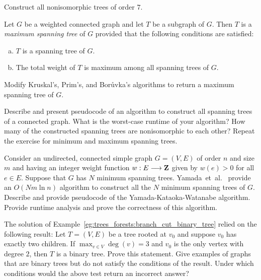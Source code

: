 \begin{problem}
\item Construct all nonisomorphic trees of order $7$.

\item Let $G$ be a weighted connected graph and let $T$ be a subgraph
  of $G$. Then $T$ is a
  \emph{maximum spanning tree} of $G$
  provided that the following conditions are satisfied:
  \begin{enumerate}[(a)]
  \item $T$ is a spanning tree of $G$.

  \item The total weight of $T$ is maximum among all spanning trees of
    $G$.
  \end{enumerate}
  Modify Kruskal's,
  Prim's, and
  Bor\r{u}vka's algorithms to return a
  maximum spanning tree of $G$.

\item Describe and present pseudocode of an algorithm to construct all
  spanning trees of a connected graph. What is the worst-case runtime
  of your algorithm? How many of the constructed spanning trees are
  nonisomorphic to each other? Repeat the exercise for minimum and
  maximum spanning trees.

\item Consider an undirected, connected simple graph $G = (V,E)$ of
  order $n$ and size $m$ and having an integer weight function
  $w: E \longrightarrow \mathbf{Z}$ given by $w(e) > 0$ for all $e \in E$. Suppose that
  $G$ has $N$ minimum spanning trees.
  Yamada~et~al.~\cite{YamadaEtAl2010} provide an
  $O(Nm \ln n)$ algorithm to construct all the $N$ minimum spanning
  trees of $G$. Describe and provide pseudocode of the
  Yamada-Kataoka-Watanabe algorithm. Provide
  runtime analysis and prove the correctness of this algorithm.

\item\label{prob:trees_forests:binary_tree_test} The solution of
  Example~\ref{eg:trees_forests:branch_cut_binary_tree} relied on the
  following result: Let $T = (V,E)$ be a tree rooted at $v_0$ and
  suppose $v_0$ has exactly two children. If
  $\max_{v \in V} \deg(v) = 3$ and $v_0$ is the only vertex with
  degree $2$, then $T$ is a binary tree. Prove this statement. Give
  examples of graphs that are binary trees but do not satisfy the
  conditions of the result. Under which conditions would the above
  test return an incorrect answer?


\end{problem}
